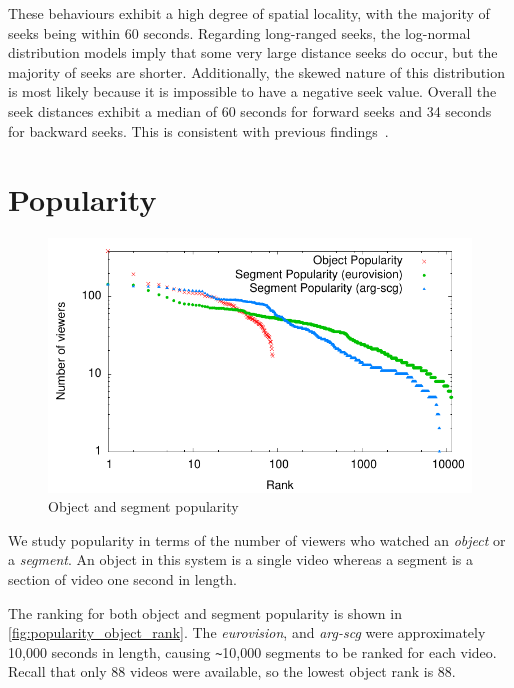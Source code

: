 
These behaviours exhibit a high degree of spatial locality, with the majority of seeks being within 60 seconds. Regarding long-ranged seeks, the log-normal distribution models imply that some very large distance seeks do occur, but the majority of seeks are shorter. Additionally, the skewed nature of this distribution is most likely because it is impossible to have a negative seek value. Overall the seek distances exhibit a median of 60 seconds for forward seeks and 34 seconds for backward seeks. This is consistent with previous findings~\cite{padhye1999cmc}.


\section{Popularity}

\begin{figure}[t]
    \centering
    \includegraphics[width=0.5\columnwidth]{./graphs/all_sessions_rank}
    \caption{Object and segment popularity}
    \label{fig:popularity_object_rank}
\end{figure}

We study popularity in terms of the number of viewers who watched an \emph{object} or a \emph{segment}. An object in this system is a single video whereas a segment is a section of video one second in length.

The ranking for both object and segment popularity is shown in \autoref{fig:popularity_object_rank}. The \emph{eurovision}, and \emph{arg-scg} were approximately 10,000 seconds in length, causing \verb+~+10,000 segments to be ranked for each video. Recall that only 88 videos were available, so the lowest object rank is 88.

